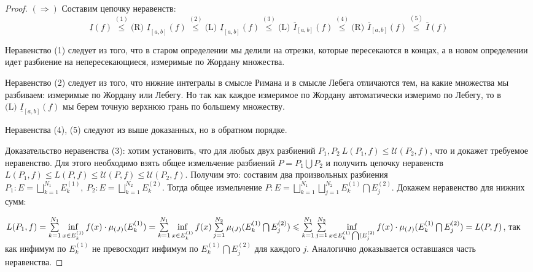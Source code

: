 \begin{proof}
$(\Rightarrow)$	Составим цепочку неравенств:
\begin{equation}
\underline{I}(f) \overset{(1)}{\leqslant} \text{(R) }\underline{I}_{[a,b]}(f)\overset{(2)}{\leqslant} \text{(L) }\underline{I}_{[a,b]}(f)\overset{(3)}{\leqslant}\text{(L) } \overline{I}_{[a,b]}(f) \overset{(4)}{\leqslant} \text{(R) } \overline{I}_{[a,b]}(f)\overset{(5)}{\leqslant} \overline{I}(f)\tag{10.1.1}\label{10.1.1} 
\end{equation}

Неравенство (1) следует из того, что в старом определении мы делили на отрезки, которые пересекаются в концах, а в новом определении идет разбиение на непересекающиеся, измеримые по Жордану множества.

Неравенство (2) следует из того, что нижние интегралы в смысле Римана и в смысле Лебега отличаются тем, на какие множества мы разбиваем: измеримые по Жордану или Лебегу. Но так как каждое измеримое по Жордану автоматически измеримо по Лебегу, то в $\text{(L) }\underline{I}_{[a,b]}(f)$ мы берем точную верхнюю грань по большему множеству.

Неравенства (4), (5) следуют из выше доказанных, но в обратном порядке.

Доказательство неравенства (3): хотим установить, что для любых двух разбиений $P_1, P_2\ L(P_1, f) \leqslant \mathcal{U}(P_2, f)$, что и докажет требуемое неравенство. Для этого необходимо взять общее измельчение разбиений $P=P_1 \bigcup P_2$ и получить цепочку неравенств $L(P_1, f) \leqslant L(P, f) \leqslant \mathcal{U}(P, f) \leqslant \mathcal{U}(P_2, f)$. Получим это: составим два произвольных разбиения 
$P_1 : E = \bigsqcup\limits_{k=1}^{N_1} E_k^{(1)},\ P_2 : E = \bigsqcup\limits_{k=1}^{N_2} E_k^{(2)}$. Тогда общее измельчение $ P : E = \bigsqcup\limits_{k=1}^{N_1} \bigsqcup\limits_{j=1}^{N_2} E_k^{(1)} \bigcap E_j^{(2)}$.
Докажем неравенство для нижних сумм:

 $L(P_1, f)=\sum\limits_{k=1}^{N_1} \inf\limits_{x\in E_k^{(1)}}f(x) \cdot \mu_{(J)}(E_k^{(1)}) =
\sum\limits_{k=1}^{N_1} \inf\limits_{x\in E_k^{(1)}}f(x) \sum\limits_{j=1}^{N_2} \mu_{(J)} (E_k^{(1)}\bigcap E_j^{(2)})\?\leqslant \sum\limits_{k=1}^{N_1}\sum\limits_{j=1}^{N_2}\inf\limits_{x\in E_k^{(1)}\bigcap (E_j^{(2)}}f(x)\cdot \mu_{(J)} (E_k^{(1)}\bigcap E_j^{(2)})=L(P,f)$, так как инфимум по $E_k^{(1)}$ не превосходит инфимум по $E_k^{(1)}\bigcap E_j^{(2)}$ для каждого $j$. Аналогично доказывается оставшаяся часть неравенства.


\end{proof}
